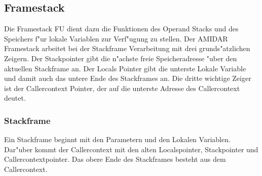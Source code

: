\subsection{Framestack}

Die Framestack FU dient dazu die Funktionen des Operand Stacks und des Speichers f"ur lokale Variablen zur Verf"ugung zu stellen. 
Der AMIDAR Framestack arbeitet bei der Stackframe Verarbeitung mit drei grunds"atzlichen Zeigern. Der Stackpointer gibt die n"achste freie Speicheradresse "uber den aktuellen Stackframe an. Der Locals Pointer gibt die unterste Lokale Variable und damit auch das untere Ende des Stackframes an. Die dritte wichtige Zeiger ist der Callercontext Pointer, der auf die unterste Adresse des Callercontext deutet. \cite{Illy}

\subsubsection{Stackframe}
Ein Stackframe beginnt mit den Parametern und den Lokalen Variablen.  Dar"uber kommt der Callercontext mit den alten Localspointer, Stackpointer und Callercontextpointer. Das obere Ende des Stackframes besteht aus dem Callercontext. 
\cite{Illy}

